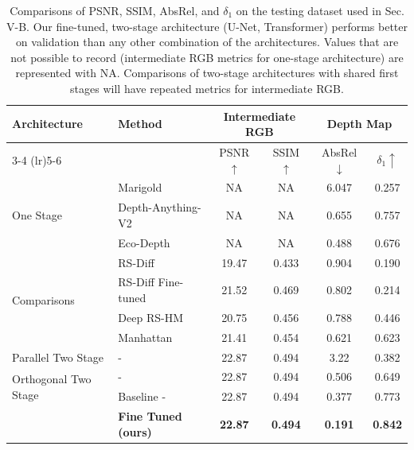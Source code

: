 \begin{table}[h!]
  \caption{Comparisons of PSNR, SSIM, AbsRel, and $\delta_1$ on the testing dataset used in Sec. V-B. Our fine-tuned, two-stage architecture (U-Net, Transformer) performs better on validation than any other combination of the architectures. Values that are not possible to record (intermediate RGB metrics for one-stage architecture) are represented with NA. Comparisons of two-stage architectures with shared first stages will have repeated metrics for intermediate RGB. }
  \centering
  \setlength{\tabcolsep}{15pt} %
  \begin{tabular}{l l c c c c}
    \hline
    \multirow{2}{*}{\textbf{Architecture}} & \multirow{2}{*}{\textbf{Method}} & \multicolumn{2}{c}{Intermediate RGB} & \multicolumn{2}{c}{Depth Map}\\
    \cmidrule(lr){3-4} \cmidrule(lr){5-6}
    & & PSNR $\uparrow$& SSIM $\uparrow$& AbsRel $\downarrow$& $\delta_1 \uparrow$\\
    \hline
    \multirow{3}{*}{One Stage} & Marigold\cite{Marigold} & NA & NA & 6.047 & 0.257\\
    & Depth-Anything-V2\cite{DepthAnything} & NA & NA & 0.655 & 0.757\\
    & Eco-Depth\cite{ecodepth} & NA & NA & 0.488 & 0.676\\
    \hline
    \multirow{4}{*}{Comparisons} & RS-Diff\cite{RS-Diffusion} & 19.47 & 0.433 & 0.904 & 0.190\\
    &RS-Diff Fine-tuned\cite{RS-Diffusion} & 21.52 & 0.469 & 0.802 & 0.214\\
    & Deep RS-HM\cite{RS-Homo} & 20.75 & 0.456 & 0.788 & 0.446\\
    & Manhattan\cite{Manhattan} & 21.41 & 0.454 & 0.621 & 0.623\\
    \hline
    \multirow{1}{*}{Parallel Two Stage} & \cite{Marigold}-\cite{Marigold} & 22.87 & 0.494 & 3.22 & 0.382\\
    \hline
    \multirow{2}{*}{Orthogonal Two Stage} & \cite{Marigold}-\cite{ecodepth} & 22.87 & 0.494 & 0.506 & 0.649\\
    & Baseline \cite{Marigold}-\cite{DepthAnything} & 22.87 & 0.494 & 0.377 & 0.773\\
    \hline
    & \textbf{Fine Tuned (ours)} & \textbf{22.87} & \textbf{0.494} & \textbf{0.191} & \textbf{0.842}\\
    \hline
  \end{tabular}
  \label{table:collocated_orthogonal_table}
  \vspace{-2mm}
\end{table}
